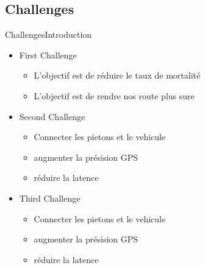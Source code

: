 

\subsection*{Challenges}
\begin{frame}[bg]{Challenges}{Introduction} %
	\begin{itemize}
		\item First Challenge
		\begin{itemize}
			\item L'objectif est de réduire le taux de mortalité
			\item L'objectif est de rendre nos route plus sure
		\end{itemize}
				\item Second Challenge
		\begin{itemize}
			\item Connecter les pietons et le vehicule
			\item augmenter la présision GPS
			\item réduire la latence
		\end{itemize}
				\item Third Challenge
		\begin{itemize}
			\item Connecter les pietons et le vehicule
			\item augmenter la présision GPS
			\item réduire la latence
		\end{itemize}
	\end{itemize}
\end{frame}

